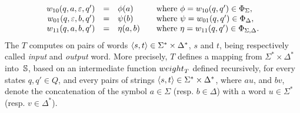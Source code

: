\[
\begin{array}{rcll}
\wei_{10}(q, a, \varepsilon, q') & = & \phi(a) & %
\quad\mathrm{where~} \phi = \wei_{10}(q, q') \in \Phi_\Sigma,\\
\wei_{01}(q, \varepsilon, b, q') & = & \psi(b) & 
\quad\mathrm{where~} \psi = \wei_{01}(q, q') \in \Phi_\Delta,\\
\wei_{11}(q, a, b, q') & = & \eta(a, b) & 
\quad\mathrm{where~} \eta = \wei_{11}(q, q') \in \Phi_{\Sigma, \Delta}.\\
\end{array}      
\]
%
\noindent 
The \SWT $T$ computes on pairs of words $\< s, t> \in \Sigma^* \times \Delta^*$,
$s$ and $t$, being respectively called \emph{input} and \emph{output} word.
More precisely, $T$ defines a mapping 
from $\Sigma^* \times \Delta^*$ into~$\mathbb{S}$,
based on an intermediate function $\weight_T$
defined recursively, for every states $q, q' \in Q$, 
and every pairs of strings $\< s, t> \in \Sigma^* \times \Delta^*$,
where $au$, and $bv$, denote the concatenation
of the symbol $a \in \Sigma$ (resp. $b \in \Delta$) 
with a word $u \in \Sigma^*$ (resp. $v \in \Delta^*$).
%
%

